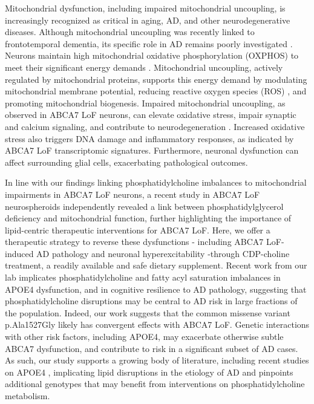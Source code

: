 Mitochondrial dysfunction, including impaired mitochondrial uncoupling, is increasingly recognized as critical in aging, AD, and other neurodegenerative diseases. Although mitochondrial uncoupling was recently linked to frontotemporal dementia, its specific role in AD remains poorly investigated \cite{noauthor_2022-os,Bano2023-qz,Zong2024-tn,Demine2019-qj,noauthor_2013-rt,Picca2023-gt}. Neurons maintain high mitochondrial oxidative phosphorylation (OXPHOS) to meet their significant energy demands \cite{Morant-Ferrando2023-va,Trigo2022-ym}. Mitochondrial uncoupling, actively regulated by mitochondrial proteins\cite{Park2023-fa,noauthor_2016-fg}, supports this energy demand by modulating mitochondrial membrane potential, reducing reactive oxygen species (ROS) \cite{Demine2019-qj,Shadel2015-kt}, and promoting mitochondrial biogenesis\cite{Korshunov1997-aj,Wisloff2005-ho,Andrews2005-yy,noauthor_2022-vx}. Impaired mitochondrial uncoupling, as observed in ABCA7 LoF neurons, can elevate oxidative stress, impair synaptic and calcium signaling, and contribute to neurodegeneration \cite{Korshunov1997-aj,Wisloff2005-ho,Andrews2005-yy,noauthor_2022-vx}. Increased oxidative stress also triggers DNA damage and inflammatory responses, as indicated by ABCA7 LoF transcriptomic signatures\cite{Robert2020-sc,Volanti2002-mc,Canty1999-oj,Schreck1992-zr}. Furthermore, neuronal dysfunction can affect surrounding glial cells, exacerbating pathological outcomes\cite{Byrns2024-id,Welch2022-ef}.

In line with our findings linking phosphatidylcholine imbalances to mitochondrial impairments in ABCA7 LoF neurons, a recent study in ABCA7 LoF neurospheroids independently revealed a link between phosphatidylglycerol deficiency and mitochondrial function\cite{Kawatani2023-vf}, further highlighting the importance of lipid-centric therapeutic interventions for ABCA7 LoF. Here, we offer a therapeutic strategy to reverse these dysfunctions - including ABCA7 LoF-induced AD pathology and neuronal hyperexcitability -through CDP-choline treatment, a readily available and safe dietary supplement\cite{Gavrilova2018-oi,Zeisel2009-xv,Blusztajn2017-nv}.  Recent work from our lab implicates phosphatidylcholine and fatty acyl saturation imbalances in APOE4 dysfunction\cite{Sienski2021-zt}, and in cognitive resilience to AD pathology\cite{Mathys2024-ex}, suggesting that phosphatidylcholine disruptions may be central to AD risk in large fractions of the population. Indeed, our work suggests that the common missense variant p.Ala1527Gly likely has convergent effects with ABCA7 LoF. Genetic interactions with other risk factors, including APOE4, may exacerbate otherwise subtle ABCA7 dysfunction, and contribute to risk in a significant subset of AD cases\cite{Wang2021-oa,Hemani2013-zr,Haig2011-vs,Zuk2012-uz}. As such, our study supports a growing body of literature, including recent studies on APOE4 \cite{Haney2024-fx,Victor2022-tl}, implicating lipid disruptions in the etiology of AD and pinpoints additional genotypes that may benefit from interventions on phosphatidylcholine metabolism.


